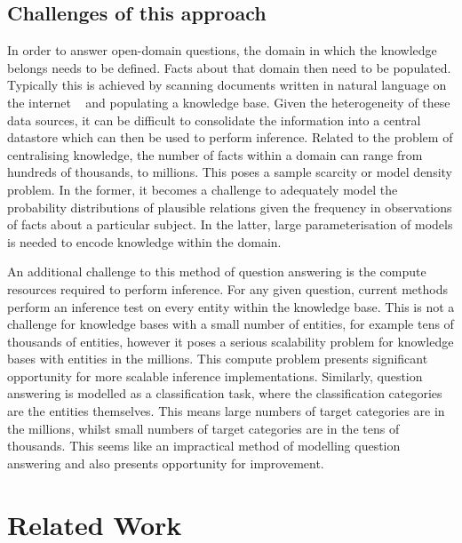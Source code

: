 \subsection{Challenges of this approach} 

In order to answer open-domain questions, the domain in which the knowledge belongs needs to be defined. Facts about that domain then need to be populated. Typically this is achieved by scanning documents written in natural language on the internet \unskip~\citep{fader2011identifying, dong2014knowledge} and populating a knowledge base. Given the heterogeneity of these data sources, it can be difficult to consolidate the information into a central datastore which can then be used to perform inference.  Related to the problem of centralising knowledge, the number of facts within a domain can range from hundreds of thousands, to millions. This poses a sample scarcity or model density problem. In the former, it becomes a challenge to adequately model the probability distributions of plausible relations given the frequency in observations of facts about a particular subject. In the latter, large parameterisation of models is needed to encode knowledge within the domain. \par

\noindent An additional challenge to this method of question answering is the compute resources required to perform inference. For any given question, current methods perform an inference test on every entity within the knowledge base. This is not a challenge for knowledge bases with a small number of entities, for example tens of thousands of entities, however it poses a serious scalability problem for knowledge bases with entities in the millions. This compute problem presents significant opportunity for more scalable inference implementations. Similarly, question answering is modelled as a classification task, where the classification categories are the entities themselves. This means large numbers of target categories are in the millions, whilst small numbers of target categories are in the tens of thousands. This seems like an impractical method of modelling question answering and also presents opportunity for improvement. 



\section{Related Work} %

